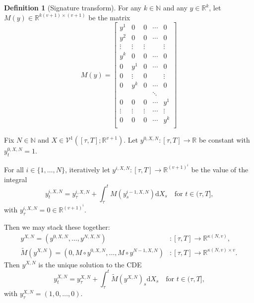 \documentclass{article}
\theoremstyle{plain}
\theoremstyle{definition}
\newtheorem{definition}[thm]{Definition}
\newcommand{\reals}{\mathbb{R}}
\newcommand{\naturals}{\mathbb{N}}
\begin{document}
	\begin{definition}[Signature transform]\label{definition:signature}
	For any $k \in \naturals$ and any $y \in \reals^k$, let $M(y) \in \reals^{k(v + 1) \times (v + 1)}$ be the matrix
	\begin{equation*}
	M(y) = \begin{bmatrix}
	y^1 & 0 & 0 & \cdots & 0\\
	y^2 & 0 & 0 & \cdots & 0\\
	\vdots & \vdots & \vdots && \vdots\\
	y^k & 0 & 0 & \cdots & 0\\
	0 & y^1 & 0 & \cdots & 0\\
	0 & \vdots & 0 && \vdots\\
	0 & y^k & 0 & \cdots & 0 \\
	&&&\ddots\\
	0 & 0 & 0 & \cdots & y^1\\
	\vdots & \vdots & \vdots & \cdots & \vdots\\
	0 & 0 & 0 & \cdots & y^k\\
	\end{bmatrix}
	\end{equation*}
	
	Fix $N \in \naturals$ and $X \in \mathcal{V}^1([\tau, T]; \reals^{v + 1})$. Let $y^{0, X, N} \colon [\tau, T] \to \reals$ be constant with $y^{0, X, N}_t = 1$.
	
	For all $i \in \{1, \ldots, N\}$, iteratively let $y^{i, X, N} \colon [\tau, T] \to \reals^{(v + 1)^i}$ be the value of the integral
	\begin{equation*}
	y^{i, X, N}_t = y^{i, X, N}_\tau + \int_\tau^t M(y^{i - 1, X, N}_s) \mathrm{d}X_s\quad\text{for $t \in (\tau, T]$,}
	\end{equation*}
	with $y^{i, X, N}_\tau = 0 \in \reals^{(v + 1)^i}$.
	
	Then we may stack these together:
	\begin{align*}
	y^{X, N} = (y^{0, X, N}, \ldots, y^{N, X, N}) &\colon [\tau, T] \to \reals^{\kappa(N, v)},\\
	\widetilde{M}(y^{X, N}) = (0, M \circ y^{0, X, N}, \ldots, M \circ y^{N - 1, X, N}) &\colon [\tau, T] \to \reals^{\kappa(N, v) \times v}.
	\end{align*}
	Then $y^{X, N}$ is the unique solution to the CDE
	\begin{equation*}
	y^{X, N}_t = y^{X, N}_\tau + \int_\tau^t \widetilde{M}(y^{X, N})_s \mathrm{d}X_s\quad\text{for $t \in (\tau, T]$,}
	\end{equation*}
	with $y^{X, N}_\tau = (1, 0, \ldots, 0)$.
	

\end{definition}
\end{document}
